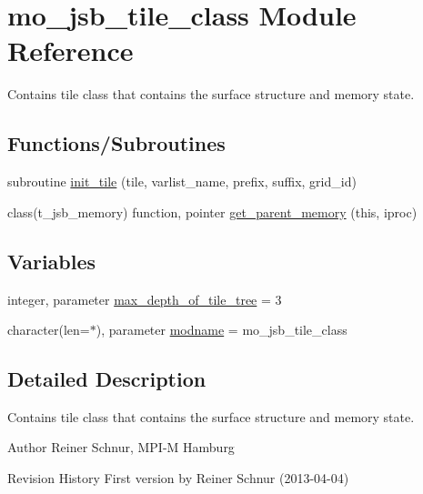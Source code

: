 \hypertarget{namespacemo__jsb__tile__class}{}\section{mo\+\_\+jsb\+\_\+tile\+\_\+class Module Reference}
\label{namespacemo__jsb__tile__class}


Contains tile class that contains the surface structure and memory state.  


\subsection*{Functions/\+Subroutines}
\begin{DoxyCompactItemize}
\item 
subroutine \hyperlink{namespacemo__jsb__tile__class_ae618ef8e5e010b55828d36a0b600d09d}{init\+\_\+tile} (tile, varlist\+\_\+name, prefix, suffix, grid\+\_\+id)
\item 
class(t\+\_\+jsb\+\_\+memory) function, pointer \hyperlink{namespacemo__jsb__tile__class_a14e8d31e3dd0d8016d308d1e25f0639a}{get\+\_\+parent\+\_\+memory} (this, iproc)
\end{DoxyCompactItemize}
\subsection*{Variables}
\begin{DoxyCompactItemize}
\item 
integer, parameter \hyperlink{namespacemo__jsb__tile__class_ae7cca4f90b1a19944271c16ec88438c2}{max\+\_\+depth\+\_\+of\+\_\+tile\+\_\+tree} = 3
\item 
character(len=$\ast$), parameter \hyperlink{namespacemo__jsb__tile__class_add38f0b08fc10e2441ef68b92fa5a8c7}{modname} = \textquotesingle{}mo\+\_\+jsb\+\_\+tile\+\_\+class\textquotesingle{}
\end{DoxyCompactItemize}


\subsection{Detailed Description}
Contains tile class that contains the surface structure and memory state. 

\begin{DoxyAuthor}{Author}
Reiner Schnur, M\+P\+I-\/\+M Hamburg
\end{DoxyAuthor}
\begin{DoxyParagraph}{Revision History}
First version by Reiner Schnur (2013-\/04-\/04) 
\end{DoxyParagraph}



